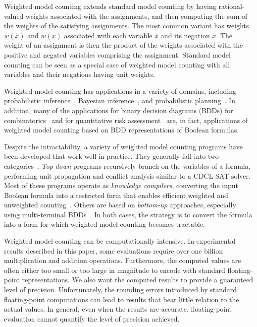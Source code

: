 \documentclass[letterpaper,USenglish,cleveref, autoref, thm-restate]{lipics-v2021}
\newcommand{\obar}[1]{\overline{#1}}
\begin{document}
Weighted model counting extends standard model counting by having
rational-valued weights associated with the assignments, and then
computing the sum of the weights of the satisfying assignments.  The
most common variant has weights $w(x)$ and $w(\obar{x})$
associated with each variable $x$ and its negation $\obar{x}$.  The
weight of an assignment is then the product of the weights associated
with the positive and negated variables comprising the assignment.
Standard model counting can be seen as a special case of weighted model
counting with all variables and their negations having unit weights.

Weighted model counting has applications in a variety of domains,
including probabilistic inference~\cite{chavira:ai:2008}, Bayesian
inference~\cite{sang:aaai:2005}, and probabilistic
planning~\cite{domshlak:jair:2007}.  In addition, many of the
applications for binary decision diagrams (BDDs) for
combinatorics~\cite{knuth:bdd:2011} and for quantitative risk
assessment~\cite{xing:wiley:2015} are, in fact, applications of
weighted model counting based on BDD representations of Boolean
formulas.

Despite the intractability, a variety of weighted model counting
programs have been developed that work well in practice.  They
generally fall into two categories~\cite{shaw:kr:2024}. \emph{Top-down} programs
recursively branch on the variables of a formula, performing unit
propagation and conflict analysis similar to a CDCL SAT solver.  Most
of these programs operate as \emph{knowledge compilers}, converting
the input Boolean formula into a restricted form that enables efficient
weighted and unweighted counting~\cite{darwiche:aaai:2002,darwiche:ecai:2004,lagniez:ijcai:2017,muise:cai:2012,oztok:cp:2014,sharma:ijcai:2019}.
Others are based on \emph{bottom-up} approaches, especially using
multi-terminal BDDs~\cite{dudek:aaai:2020,dudek:sat:2021}.  In both
cases, the strategy is to convert the formula into a form for which
weighted model counting becomes tractable.

Weighted model counting can be computationally intensive.  In
experimental results described in this paper, some evaluations 
require over one billion multiplication and addition operations.
Furthermore, the computed values are often either too small or too
large in magnitude to encode with standard floating-point
representations.  We also want the computed results to provide a
guaranteed level of precision.  Unfortunately, the rounding errors
introduced by standard floating-point computations can lead to results
that bear little relation to the actual values.  In general, even when the results are accurate,
floating-point evaluation cannot quantify the level of precision achieved.
\end{document}
